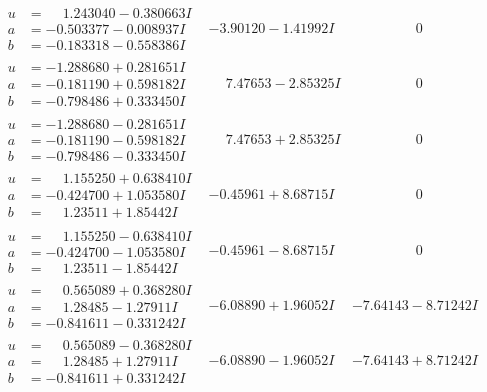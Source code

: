\documentclass[1p]{elsarticle_modified}
\theoremstyle{definition}
\begin{document}
$$\begin{array}{c|c|c}
\begin{aligned}
u &= \phantom{-}1.243040 - 0.380663 I \\
a &= -0.503377 - 0.008937 I \\
b &= -0.183318 - 0.558386 I\end{aligned}
 & -3.90120 - 1.41992 I & \phantom{-0.000000 } 0 \\ \hline\begin{aligned}
u &= -1.288680 + 0.281651 I \\
a &= -0.181190 + 0.598182 I \\
b &= -0.798486 + 0.333450 I\end{aligned}
 & \phantom{-}7.47653 - 2.85325 I & \phantom{-0.000000 } 0 \\ \hline\begin{aligned}
u &= -1.288680 - 0.281651 I \\
a &= -0.181190 - 0.598182 I \\
b &= -0.798486 - 0.333450 I\end{aligned}
 & \phantom{-}7.47653 + 2.85325 I & \phantom{-0.000000 } 0 \\ \hline\begin{aligned}
u &= \phantom{-}1.155250 + 0.638410 I \\
a &= -0.424700 + 1.053580 I \\
b &= \phantom{-}1.23511 + 1.85442 I\end{aligned}
 & -0.45961 + 8.68715 I & \phantom{-0.000000 } 0 \\ \hline\begin{aligned}
u &= \phantom{-}1.155250 - 0.638410 I \\
a &= -0.424700 - 1.053580 I \\
b &= \phantom{-}1.23511 - 1.85442 I\end{aligned}
 & -0.45961 - 8.68715 I & \phantom{-0.000000 } 0 \\ \hline\begin{aligned}
u &= \phantom{-}0.565089 + 0.368280 I \\
a &= \phantom{-}1.28485 - 1.27911 I \\
b &= -0.841611 - 0.331242 I\end{aligned}
 & -6.08890 + 1.96052 I & -7.64143 - 8.71242 I \\ \hline\begin{aligned}
u &= \phantom{-}0.565089 - 0.368280 I \\
a &= \phantom{-}1.28485 + 1.27911 I \\
b &= -0.841611 + 0.331242 I\end{aligned}
 & -6.08890 - 1.96052 I & -7.64143 + 8.71242 I\\

\end{array}$$
\end{document}
